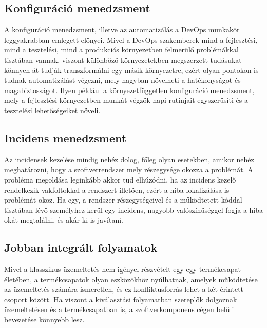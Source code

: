 \subsection*{Konfiguráció menedzsment}
A konfiguráció menedzsment, illetve az automatizálás a DevOps munkakör leggyakrabban emlegett előnyei. Mivel a DevOps szakemberek mind a fejlesztési, mind a tesztelési, mind a produkciós környezetben felmerülő problémákkal tisztában vannak, viszont különböző környezetekben megszerzett tudásukat könnyen át tudják transzformálni egy másik környezetre, ezért olyan pontokon is tudnak automatizálást végezni, mely nagyban növelheti a hatékonyságot és magabiztosságot. Ilyen például a környezetfüggetlen konfiguráció menedzsment, mely a fejlesztési környezetben munkát végzők napi rutinjait egyszerűsíti és a tesztelési lehetőségeiket növeli.

\subsection*{Incidens menedzsment}
Az incidensek kezelése mindig nehéz dolog, főleg olyan esetekben, amikor nehéz meghatározni, hogy a szoftverrendszer mely részegysége okozza a problémát. A probléma megoldása leginkább akkor tud elhúzódni, ha az incidens kezelő rendelkezik vakfoltokkal a rendszert illetően, ezért a hiba lokalizálása is problémát okoz.
Ha egy, a rendszer részegységeivel és a működtetett kóddal tisztában lévő személyhez kerül egy incidens, nagyobb valószínűséggel fogja a hiba okát megtalálni, és akár ki is javítani.

\subsection*{Jobban integrált folyamatok}
Mivel a klasszikus üzemeltetés nem igényel részvételt egy-egy termékcsapat életében, a termékcsapatok olyan eszközökhöz nyúlhatnak, amelyek működtetése az üzemeltetés számára ismeretlen, és ez konfliktusforrás lehet a két érintett csoport között. Ha viszont a kiválasztási folyamatban szereplők dolgoznak üzemeltetésen és a termékcsapatban is, a szoftverkomponens cégen belüli bevezetése könnyebb lesz.